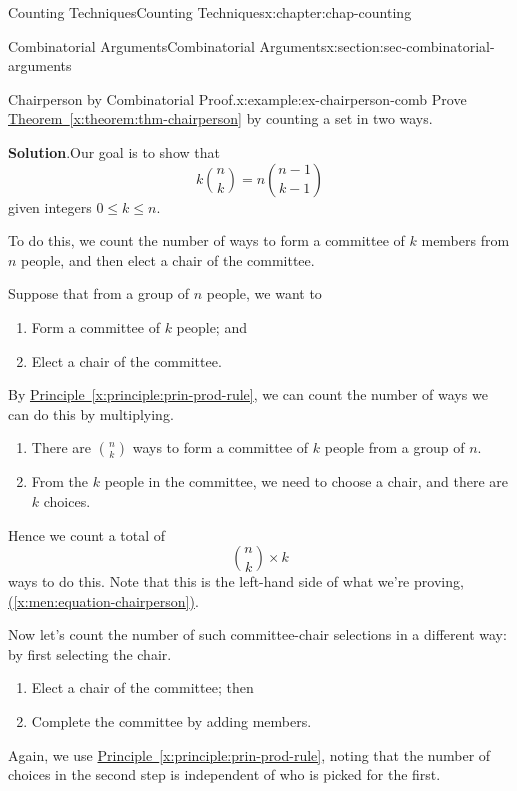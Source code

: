 \documentclass[oneside,10pt,]{book}
\newcommand{\blocktitlefont}{\relax}
\newcommand{\xreffont}{\relax}
\numberwithin{equation}{section}
\begin{document}
\begin{chapterptx}{Counting Techniques}{}{Counting Techniques}{}{}{x:chapter:chap-counting}
\begin{sectionptx}{Combinatorial Arguments}{}{Combinatorial Arguments}{}{}{x:section:sec-combinatorial-arguments}
\begin{example}{Chairperson by Combinatorial Proof.}{x:example:ex-chairperson-comb}%
Prove \hyperref[x:theorem:thm-chairperson]{Theorem~{\xreffont\ref{x:theorem:thm-chairperson}}} by counting a set in two ways.%
\par\smallskip%
\noindent\textbf{\blocktitlefont Solution}.\hypertarget{g:solution:id475018}{}\quad{}Our goal is to show that%
\begin{equation}
k\binom{n}{k} = n\binom{n-1}{k-1}\label{x:men:equation-chairperson}
\end{equation}
given integers \(0 \leq k \leq n\).%
\par
To do this, we count the number of ways to form a committee of \(k\) members from \(n\) people, and then elect a chair of the committee.%
\par
Suppose that from a group of \(n\) people, we want to%
\begin{enumerate}
\item{}Form a committee of \(k\) people; and%
\item{}Elect a chair of the committee.%
\end{enumerate}
By \hyperref[x:principle:prin-prod-rule]{Principle~{\xreffont\ref{x:principle:prin-prod-rule}}}, we can count the number of ways we can do this by multiplying.%
\begin{enumerate}
\item{}There are \(\binom{n}{k}\) ways to form a committee of \(k\) people from a group of \(n\).%
\item{}From the \(k\) people in the committee, we need to choose a chair, and there are \(k\) choices.%
\end{enumerate}
Hence we count a total of%
\begin{equation*}
\binom{n}{k} \times k
\end{equation*}
ways to do this. Note that this is the left-hand side of what we're proving, \hyperref[x:men:equation-chairperson]{({\xreffont\ref{x:men:equation-chairperson}})}.%
\par
Now let's count the number of such committee-chair selections in a different way: by first selecting the chair.%
\begin{enumerate}
\item{}Elect a chair of the committee; then%
\item{}Complete the committee by adding members.%
\end{enumerate}
Again, we use \hyperref[x:principle:prin-prod-rule]{Principle~{\xreffont\ref{x:principle:prin-prod-rule}}}, noting that the number of choices in the second step is independent of who is picked for the first.%

\end{example}
\end{sectionptx}
\end{chapterptx}
\end{document}
